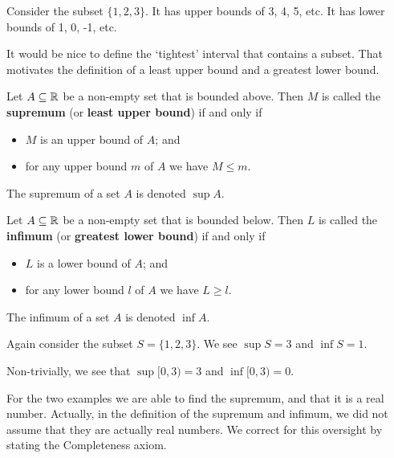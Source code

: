 \begin{example}
    Consider the subset $\{1, 2, 3\}$. It has upper bounds of 3, 4, 5, etc. It has lower bounds of 1, 0, -1, etc.
\end{example}

It would be nice to define the `tightest' interval that contains a subset. That motivates the definition of a least upper bound and a greatest lower bound.

\begin{definition}
    Let $A\subseteq \mathbb{R}$ be a non-empty set that is bounded above. Then $M$ is called the \textbf{supremum} (or \textbf{least upper bound}) if and only if
    \begin{itemize}
        \item $M$ is an upper bound of $A$; and
        \item for any upper bound $m$ of $A$ we have $M \leq m$.
    \end{itemize}
    The supremum of a set $A$ is denoted $\sup A$.
\end{definition}

\begin{definition}
    Let $A\subseteq \mathbb{R}$ be a non-empty set that is bounded below. Then $L$ is called the \textbf{infimum} (or \textbf{greatest lower bound}) if and only if
    \begin{itemize}
        \item $L$ is a lower bound of $A$; and
        \item for any lower bound $l$ of $A$ we have $L \geq l$.
    \end{itemize}
    The infimum of a set $A$ is denoted $\inf A$.
\end{definition}

\begin{example}
    Again consider the subset $S = \{1, 2, 3\}$. We see $\sup S = 3$ and $\inf S = 1$.
\end{example}

\begin{example}
    Non-trivially, we see that $\sup [0, 3) = 3$ and $\inf [0, 3) = 0$.
\end{example}

For the two examples we are able to find the supremum, and that it is a real number. Actually, in the definition of the supremum and infimum, we did not assume that they are actually real numbers. We correct for this oversight by stating the Completeness axiom.

